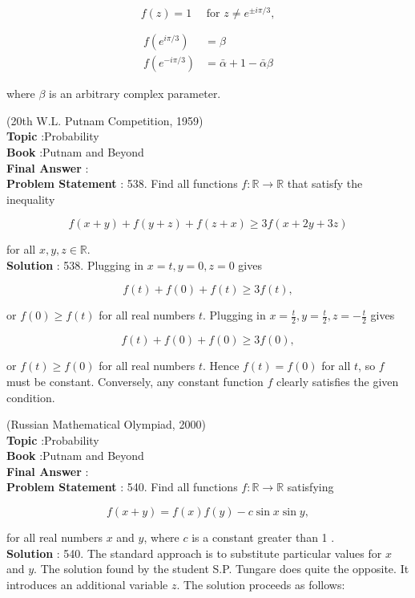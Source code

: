 \documentclass[10pt]{article}
\begin{document}
$$
f(z)=1 \quad \text { for } z \neq e^{\pm i \pi / 3},
$$



$$
\begin{aligned}
f\left(e^{i \pi / 3}\right) &=\beta \\
f\left(e^{-i \pi / 3}\right) &=\bar{\alpha}+1-\bar{\alpha} \beta
\end{aligned}
$$

where $\beta$ is an arbitrary complex parameter.

(20th W.L. Putnam Competition, 1959)
\\
\textbf{Topic} :Probability\\
\textbf{Book} :Putnam and Beyond\\
\textbf{Final Answer} :\\


\textbf{Problem Statement} :
538. Find all functions $f: \mathbb{R} \rightarrow \mathbb{R}$ that satisfy the inequality

$$
f(x+y)+f(y+z)+f(z+x) \geq 3 f(x+2 y+3 z)
$$

for all $x, y, z \in \mathbb{R}$.
\\
\textbf{Solution} :
538. Plugging in $x=t, y=0, z=0$ gives

$$
f(t)+f(0)+f(t) \geq 3 f(t),
$$

or $f(0) \geq f(t)$ for all real numbers $t$. Plugging in $x=\frac{t}{2}, y=\frac{t}{2}, z=-\frac{t}{2}$ gives

$$
f(t)+f(0)+f(0) \geq 3 f(0),
$$

or $f(t) \geq f(0)$ for all real numbers $t$. Hence $f(t)=f(0)$ for all $t$, so $f$ must be constant. Conversely, any constant function $f$ clearly satisfies the given condition.

(Russian Mathematical Olympiad, 2000)
\\
\textbf{Topic} :Probability\\
\textbf{Book} :Putnam and Beyond\\
\textbf{Final Answer} :\\


\textbf{Problem Statement} :
540. Find all functions $f: \mathbb{R} \rightarrow \mathbb{R}$ satisfying

$$
f(x+y)=f(x) f(y)-c \sin x \sin y,
$$

for all real numbers $x$ and $y$, where $c$ is a constant greater than 1 .
\\
\textbf{Solution} :
540. The standard approach is to substitute particular values for $x$ and $y$. The solution found by the student S.P. Tungare does quite the opposite. It introduces an additional variable $z$. The solution proceeds as follows:
\end{document}
